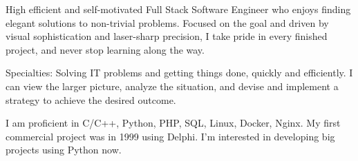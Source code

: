 
High efficient and self-motivated Full Stack Software Engineer who enjoys
finding elegant solutions to non-trivial problems. Focused on the goal and
driven by visual sophistication and laser-sharp precision, I take pride in
every finished project, and never stop learning along the way.

Specialties: Solving IT problems and getting things done, quickly and efficiently.
I can view the larger picture, analyze the situation, and devise and implement a
strategy to achieve the desired outcome.

I am proficient in C/C++, Python, PHP, SQL, Linux, Docker, Nginx. My first commercial
project was in 1999 using Delphi. I'm interested in developing big projects using
Python now.

\begin{cventries}
\end{cventries}
